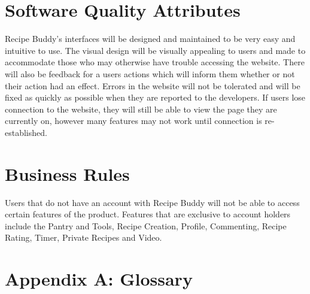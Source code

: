 \documentclass{scrreprt}
\begin{document}
\section{Software Quality Attributes}
\gls{Recipe Buddy}'s interfaces will be designed and maintained to be very easy and intuitive to use. The visual design will be visually appealing to users and made to accommodate those who may otherwise have trouble accessing the website. There will also be feedback for a users actions which will inform them whether or not their action had an effect. Errors in the website will not be tolerated and will be fixed as quickly as possible when they are reported to the developers. If users lose connection to the website, they will still be able to view the page they are currently on, however many features may not work until connection is re-established.

\section{Business Rules}
Users that do not have an account with \gls{Recipe Buddy} will not be able to access certain features of the product. Features that are exclusive to account holders include the Pantry and Tools, Recipe Creation, Profile, Commenting, Recipe Rating, Timer, Private Recipes and Video.

\section{Appendix A: Glossary}
\printglossaries


\end{document}
